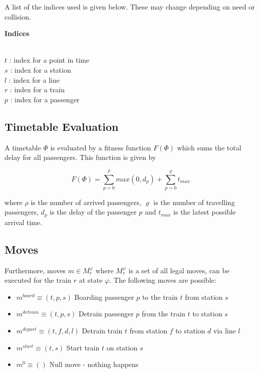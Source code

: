 \documentclass[a4paper,12pt,parskip]{article}
\begin{document}
A list of the indices used is given below. These may change depending on need or 
collision.

\hfill 

\noindent \textbf{Indices}

\noindent \\
$t$ : index for a point in time \\
$s$ : index for a station \\
$l$ : index for a line \\
$r$ : index for a train \\
$p$ : index for a passenger \\

\subsection{Timetable Evaluation}

A timetable $\Phi$ is evaluated by a fitness function $F(\Phi)$ which sums the total 
delay for all passengers. This function is given by

$$
F(\Phi) = \sum_{p=0}^{\rho} max(0, d_{p}) + \sum_{p=0}^{\varrho} t_{max}
$$

where $\rho$ is the number of arrived passengers, $\varrho$ is the number of 
travelling passengers, $d_{p}$ is the delay of the passenger $p$ and $t_{max}$ 
is the latest possible arrival time.

\subsection{Moves}

Furthermore, moves $m \in M^{\varphi}_{r}$ where $M^{\varphi}_r$ is a set of 
all legal moves, can be executed for the train $r$ at state $\varphi$. The 
following moves are possible:

\begin{itemize}
    \item $m^{board} \equiv (t,p,s)$ Boarding passenger $p$ to the train $t$ from station $s$
    \item $m^{detrain} \equiv (t,p,s)$ Detrain passenger $p$ from the train $t$ to station $s$
    \item $m^{depart} \equiv (t,f,d,l)$ Detrain train $t$ from station $f$ to station $d$ via line $l$
    \item $m^{start} \equiv (t,s)$ Start train $t$ on station $s$
    \item $m^{0} \equiv ()$ Null move - nothing happens
\end{itemize}
\end{document}

